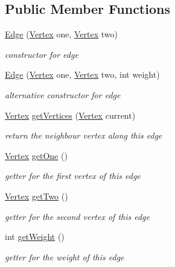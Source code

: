 \subsection*{Public Member Functions}
\begin{DoxyCompactItemize}
\item 
\hyperlink{class_edge_ad763d55acaac9dea971255819e8fde06}{Edge} (\hyperlink{class_vertex}{Vertex} one, \hyperlink{class_vertex}{Vertex} two)
\begin{DoxyCompactList}\small\item\em constructor for edge \end{DoxyCompactList}\item 
\hyperlink{class_edge_a5b282bda21b36ca17d9c3614943d5387}{Edge} (\hyperlink{class_vertex}{Vertex} one, \hyperlink{class_vertex}{Vertex} two, int weight)
\begin{DoxyCompactList}\small\item\em alternative constructor for edge \end{DoxyCompactList}\item 
\hyperlink{class_vertex}{Vertex} \hyperlink{class_edge_abf42bcb6e0c33e5a66e73170d4591522}{get\+Vertices} (\hyperlink{class_vertex}{Vertex} current)
\begin{DoxyCompactList}\small\item\em return the neighbour vertex along this edge \end{DoxyCompactList}\item 
\hyperlink{class_vertex}{Vertex} \hyperlink{class_edge_ab980e6d28be975d55e1ccffaffd173fd}{get\+One} ()
\begin{DoxyCompactList}\small\item\em getter for the first vertex of this edge \end{DoxyCompactList}\item 
\hyperlink{class_vertex}{Vertex} \hyperlink{class_edge_a676c0a445a28d7da2b1efd4e612f11eb}{get\+Two} ()
\begin{DoxyCompactList}\small\item\em getter for the second vertex of this edge \end{DoxyCompactList}\item 
int \hyperlink{class_edge_a963d963b098f2329738cde01942be520}{get\+Weight} ()
\begin{DoxyCompactList}\small\item\em getter for the weight of this edge \end{DoxyCompactList}\item 

\end{DoxyCompactItemize}
